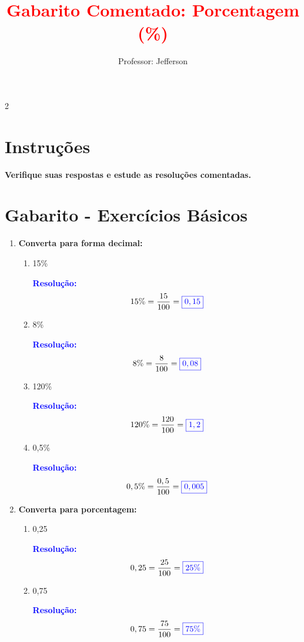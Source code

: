 \documentclass[11pt]{article}
\title{\textcolor{red}{Gabarito Comentado: Porcentagem (\%)}}
\author{Professor: Jefferson}
\date{}
\newcommand{\respostaNum}[1]{\textcolor{blue}{\boxed{#1}}}
\newcommand{\resolucao}{\textbf{\textcolor{blue}{Resolução:}}}
\begin{document}
\maketitle
\vspace{-1cm}

\begin{multicols}{2}

\section*{Instruções}
\textbf{Verifique suas respostas e estude as resoluções comentadas.}

\section*{Gabarito - Exercícios Básicos}

\begin{enumerate}[leftmargin=*]

\item \textbf{Converta para forma decimal:}

\begin{enumerate}[label=\alph*)]
\item 15\%

\resolucao
\[
15\% = \frac{15}{100} = \respostaNum{0,15}
\]

\item 8\%

\resolucao
\[
8\% = \frac{8}{100} = \respostaNum{0,08}
\]

\item 120\%

\resolucao
\[
120\% = \frac{120}{100} = \respostaNum{1,2}
\]

\item 0,5\%

\resolucao
\[
0,5\% = \frac{0,5}{100} = \respostaNum{0,005}
\]
\end{enumerate}

\item \textbf{Converta para porcentagem:}

\begin{enumerate}[label=\alph*)]
\item 0,25

\resolucao
\[
0,25 = \frac{25}{100} = \respostaNum{25\%}
\]

\item 0,75

\resolucao
\[
0,75 = \frac{75}{100} = \respostaNum{75\%}
\]


\end{enumerate}
\end{enumerate}
\end{multicols}
\end{document}
